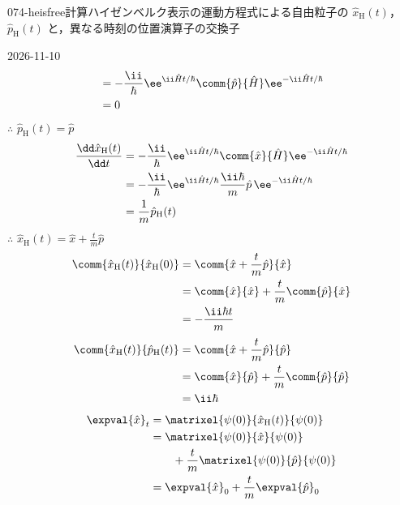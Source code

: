 \documentclass[uplatex,dvipdfmx,a4paper,11pt]{jsarticle}
\begin{document}
\begin{mondai}{074-heisfree}{計算}{ハイゼンベルク表示の運動方程式による自由粒子の $\hat{x}_{\mathrm{H}}(t)$，$\hat{p}_{\mathrm{H}}(t)$ と，異なる時刻の位置演算子の交換子}
\begin{kotaeutsushi}{2026-11-10}
\begin{align*}
&=-\frac{\ii}{\hbar}\ee^{\ii\hat{H}t/\hbar}\comm{\hat{p}}{\hat{H}}\ee^{-\ii\hat{H}t/\hbar}\\
&=0
\end{align*}
$\therefore$ $\hat{p}_{\mathrm{H}}(t)=\hat{p}$
\begin{align*}
\frac{\dd\hat{x}_{\mathrm{H}}(t)}{\dd t}&=-\frac{\ii}{\hbar}\ee^{\ii\hat{H}t/\hbar}\comm{\hat{x}}{\hat{H}}\ee^{-\ii\hat{H}t/\hbar}\\
&=-\frac{\ii}{\hbar}\ee^{\ii\hat{H}t/\hbar}\frac{\ii\hbar}{m}\hat{p}\,\ee^{-\ii\hat{H}t/\hbar}\\
&=\frac{1}{m}\hat{p}_{\mathrm{H}}(t)
\end{align*}
$\therefore$ $\hat{x}_{\mathrm{H}}(t)=\hat{x}+\frac{t}{m}\hat{p}$
\begin{align*}
\comm{\hat{x}_{\mathrm{H}}(t)}{\hat{x}_{\mathrm{H}}(0)}&=\comm{\hat{x}+\frac{t}{m}\hat{p}}{\hat{x}}\\
&=\comm{\hat{x}}{\hat{x}}+\frac{t}{m}\comm{\hat{p}}{\hat{x}}\\
&=-\frac{\ii\hbar t}{m}
\end{align*}
\begin{align*}
\comm{\hat{x}_{\mathrm{H}}(t)}{\hat{p}_{\mathrm{H}}(t)}&=\comm{\hat{x}+\frac{t}{m}\hat{p}}{\hat{p}}\\
&=\comm{\hat{x}}{\hat{p}}+\frac{t}{m}\comm{\hat{p}}{\hat{p}}\\
&=\ii\hbar
\end{align*}
\begin{align*}
\expval{\hat{x}}_{t}&=\matrixel{\psi(0)}{\hat{x}_{\mathrm{H}}(t)}{\psi(0)}\\
&=\matrixel{\psi(0)}{\hat{x}}{\psi(0)}\\
&\qquad+\frac{t}{m}\matrixel{\psi(0)}{\hat{p}}{\psi(0)}\\
&=\expval{\hat{x}}_{0}+\frac{t}{m}\expval{\hat{p}}_{0}
\end{align*}
\end{kotaeutsushi}
\end{mondai}
\end{document}
